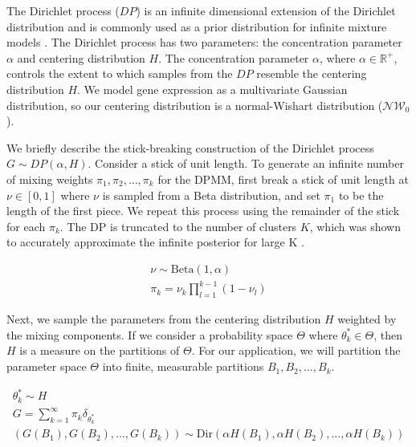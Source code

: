 \documentclass[10pt,letterpaper]{article}
\begin{document}
The Dirichlet process ($DP$) is an infinite dimensional extension of the Dirichlet distribution \cite{fergusonBayesianAnalysisNonparametric1973} and is commonly used as a prior distribution for infinite mixture models \cite{muller2004nonparametric, gorurDirichletProcessGaussian2010}. The Dirichlet process has two parameters: the concentration parameter $\alpha$ and centering distribution $H$. The concentration parameter $\alpha$, where $\alpha \in \mathbb{R}^+$, controls the extent to which samples from the $DP$ resemble the centering distribution $H$. We model gene expression as a multivariate Gaussian distribution, so our centering distribution is a normal-Wishart distribution ($\mathcal{NW}_0$).

We briefly describe the stick-breaking construction of the Dirichlet process $G \sim DP(\alpha, H)$. Consider a stick of unit length. To generate an infinite number of mixing weights $\pi_1, \pi_2, ..., \pi_k$ for the DPMM, first break a stick of unit length at $\nu \in [0, 1]$ where $\nu$ is sampled from a Beta distribution, and set $\pi_1$ to be the length of the first piece. We repeat this process using the remainder of the stick for each $\pi_k$. The DP is truncated to the number of clusters $K$, which was shown to accurately approximate the infinite posterior for large K \cite{hughes2013memoized, teh2010dirichlet, gelmanBayesianDataAnalysis2013, fergusonBayesianAnalysisNonparametric1973, mullerBayesianNonparametricData2015, phadia2015prior}.

\begin{gather}
\label{eq:dp}
\nu \sim \text{Beta}(1, \alpha) \\
\pi_k = \nu_k \prod_{l=1}^{k-1}(1 - \nu_l)
\end{gather}

Next, we sample the parameters from the centering distribution $H$ weighted by the mixing components. If we consider a probability space $\Theta$ where $\theta_k^{*} \in \Theta$, then $H$ is a measure on the partitions of $\Theta$. For our application, we will partition the parameter space $\Theta$ into finite, measurable partitions $B_1, B_2, ..., B_k$.

\begin{gather}
\theta_k^{*} \sim H \\
G = \sum_{k=1}^{\infty} \pi_k \delta_{\theta_k^{*}} \\
(G(B_1), G(B_2), ..., G(B_k)) \sim \text{Dir}(\alpha H(B_1), \alpha H(B_2), ..., \alpha H(B_k))
\end{gather}
\end{document}
